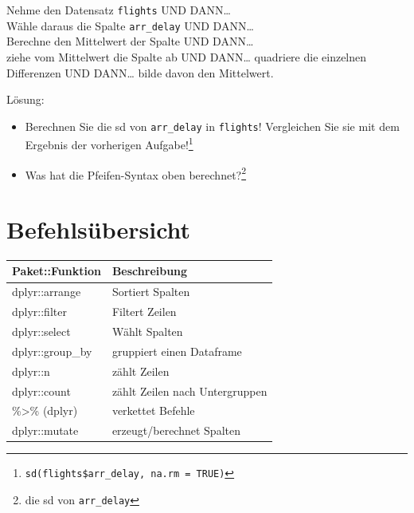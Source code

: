 \documentclass[12pt,ngerman,]{book}
\newenvironment{Shaded}{\begin{snugshade}}{\end{snugshade}}
\newcommand{\KeywordTok}[1]{\textcolor[rgb]{0.13,0.29,0.53}{\textbf{{#1}}}}
\newcommand{\DataTypeTok}[1]{\textcolor[rgb]{0.13,0.29,0.53}{{#1}}}
\newcommand{\DecValTok}[1]{\textcolor[rgb]{0.00,0.00,0.81}{{#1}}}
\newcommand{\StringTok}[1]{\textcolor[rgb]{0.31,0.60,0.02}{{#1}}}
\newcommand{\CommentTok}[1]{\textcolor[rgb]{0.56,0.35,0.01}{\textit{{#1}}}}
\newcommand{\OtherTok}[1]{\textcolor[rgb]{0.56,0.35,0.01}{{#1}}}
\newcommand{\NormalTok}[1]{{#1}}
\let\rmarkdownfootnote\footnote%
\def\footnote{\protect\rmarkdownfootnote}
\renewenvironment{Shaded}{\begin{kframe}}{\end{kframe}}
\let\BeginKnitrBlock\begin \let\EndKnitrBlock\end
\begin{document}
\BeginKnitrBlock{rmdpseudocode}
Nehme den Datensatz \texttt{flights} UND DANN\ldots{}\\
Wähle daraus die Spalte \texttt{arr\_delay} UND DANN\ldots{}\\
Berechne den Mittelwert der Spalte UND DANN\ldots{}\\
ziehe vom Mittelwert die Spalte ab UND DANN\ldots{} quadriere die
einzelnen Differenzen UND DANN\ldots{} bilde davon den Mittelwert.
\EndKnitrBlock{rmdpseudocode}

Lösung:

\begin{Shaded}
\end{Shaded}

\begin{itemize}
\item
  Berechnen Sie die sd von \texttt{arr\_delay} in \texttt{flights}!
  Vergleichen Sie sie mit dem Ergebnis der vorherigen Aufgabe!\footnote{\texttt{sd(flights\$arr\_delay,\ na.rm\ =\ TRUE)}}
\item
  Was hat die Pfeifen-Syntax oben berechnet?\footnote{die sd von
    \texttt{arr\_delay}}
\end{itemize}

\section{Befehlsübersicht}\label{befehlsubersicht-2}

\begin{longtable}[]{@{}ll@{}}
\toprule
Paket::Funktion & Beschreibung\tabularnewline
\midrule
\endhead
dplyr::arrange & Sortiert Spalten\tabularnewline
dplyr::filter & Filtert Zeilen\tabularnewline
dplyr::select & Wählt Spalten\tabularnewline
dplyr::group\_by & gruppiert einen Dataframe\tabularnewline
dplyr::n & zählt Zeilen\tabularnewline
dplyr::count & zählt Zeilen nach Untergruppen\tabularnewline
\%\textgreater{}\% (dplyr) & verkettet Befehle\tabularnewline
dplyr::mutate & erzeugt/berechnet Spalten\tabularnewline
\bottomrule
\end{longtable}
\end{document}
